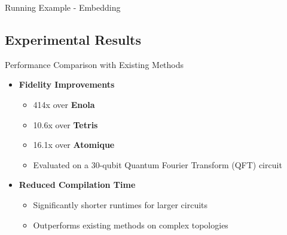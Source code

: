 \begin{frame}{Running Example - Embedding}
\centering
\scalebox{0.5}{}
  \scalebox{0.5}{}
  \scalebox{0.5}{}
  \scalebox{0.5}{}

\end{frame}

\subsection{Experimental Results}

\begin{frame}{Performance Comparison with Existing Methods}
    \begin{itemize}
        \item \textbf{Fidelity Improvements}
            \begin{itemize}
                \item 414x over \textbf{Enola}
                \item 10.6x over \textbf{Tetris}
                \item 16.1x over \textbf{Atomique}
                \item Evaluated on a 30-qubit Quantum Fourier Transform (QFT) circuit
            \end{itemize}
        \item \textbf{Reduced Compilation Time}
            \begin{itemize}
                \item Significantly shorter runtimes for larger circuits
                \item Outperforms existing methods on complex topologies
            \end{itemize}
    \end{itemize}

\end{frame}


